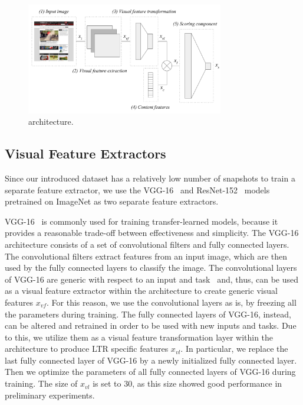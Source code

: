 

\begin{figure}[t]
\includegraphics[width = 3.4in]{images/multimodelarchitecture.pdf}
\caption{\modelname{} architecture.}
\label{fig:multimodelarchitecture}
\end{figure}

\subsection{Visual Feature Extractors} \label{sec:visualfeatures}
Since our introduced \datasetname{} data\-set has a relatively low number of snapshots to train a separate feature extractor, we use the VGG-16~\cite{simonyan2014very} and ResNet-152~\cite{he2016deep} models pretrained on ImageNet as two separate feature extractors.

VGG-16~\cite{simonyan2014very} is commonly used for training transfer-learned models,
because it provides a reasonable trade-off between effectiveness and simplicity.
The VGG-16 architecture consists of a set of convolutional filters and fully connected layers. 
The convolutional filters extract features from an input image, which are then used by the fully connected layers to classify the image. 
The convolutional layers of VGG-16 are generic with respect to an input and task~\citep{donahue2014decaf}
and, thus, can be used as a visual feature extractor within the \modelname{} architecture to create generic visual features $x_{vf}$.
For this reason, we use the convolutional layers as is, by freezing all the parameters during training.
The fully connected layers of VGG-16, instead, can be altered and retrained in order to be used with new inputs and tasks.
Due to this, we utilize them as a visual feature transformation layer within the \modelname{} architecture to produce \ac{LTR} specific features $x_{vl}$.
In particular, we replace the last fully connected layer of VGG-16 by a newly initialized fully connected layer.
Then we optimize the parameters of all fully connected layers of VGG-16 during training.
The size of $x_{vl}$ is set to $30$, as this size showed good performance in preliminary experiments.

